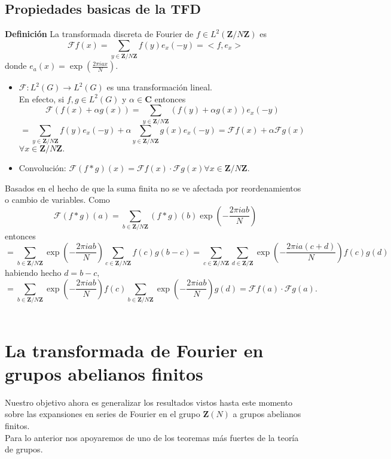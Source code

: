 \documentclass[a4paper,openright,10pt]{article}
\begin{document}

\subsection{Propiedades basicas de la TFD}
\textbf{Definici\'on} La transformada discreta de Fourier de $f\in L^{2}(\mathbf{Z}/N\mathbf{Z})$ es $$
\mathcal{F}f(x)=\sum\limits_{y\in \mathbf{Z}/N\mathbf{Z}}f(y)e_{x}(-y)=<f,e_{x}>$$ donde $e_{a}(x)=\exp(\frac{2\pi iax}{N}).$\\
\begin{itemize}
	\item $\mathcal{F}: L^{2} (G) \rightarrow L^{2} (G)$ es una transformaci\'on lineal.\\ 
    En efecto, si $f, g \in L^{2} (G)$ y $\alpha \in \mathbf{C}$ entonces $$
    \mathcal{F} (f(x)+\alpha g(x))= \sum \limits _{y \in \mathbf{Z}/N\mathbf{Z}} (f(y)+\alpha g(x))e_{x}(-y)$$ $$=
    \sum \limits _{y \in \mathbf{Z}/N\mathbf{Z}} f(y)e_{x}(-y)+\alpha\sum\limits _{y \in \mathbf{Z}/N\mathbf{Z}} g(x)e_{x}(-y) = \mathcal{F}f(x)+\alpha\mathcal{F}g(x)
    $$ $\forall x \in \mathbf{Z}/N\mathbf{Z}.$
    \item \textrm{Convoluci\'on:} $\mathcal{F} (f*g)(x)=\mathcal{F}f(x) \cdot \mathcal{F}g(x) \forall x \in \mathbf{Z}/N\mathbf{Z}.$
\end{itemize}

Basados en el hecho de que la suma finita no se ve afectada por reordenamientos o cambio de variables. 
Como $$
\mathcal{F}(f*g)(a)=\sum\limits_{b\in \mathbf{Z}/N\mathbf{Z}} (f*g)(b)\exp(-\frac{2\pi iab}{N})
$$ entonces
$$
=\sum\limits_{b\in \mathbf{Z}/N\mathbf{Z}} \exp(-\frac{2\pi iab}{N})\sum\limits_{c\in \mathbf{Z}/N\mathbf{Z}} f(c)g(b-c)=\sum\limits_{c\in \mathbf{Z}/N\mathbf{Z}}\sum\limits_{d\in \mathbf{Z}/\mathbf{Z}}\exp(-\frac{2\pi ia(c+d)}{N})f(c)g(d)
$$ habiendo hecho $d=b-c,$
$$
=\sum\limits_{b\in \mathbf{Z}/N\mathbf{Z}} \exp(-\frac{2\pi iab}{N})f(c) \sum\limits_{b\in \mathbf{Z}/N\mathbf{Z}}\exp(-\frac{2\pi iab}{N}) g(d)=\mathcal{F}f(a)\cdot \mathcal{F}g(a).
$$\\

\section{La transformada de Fourier en grupos abelianos finitos} 
Nuestro objetivo ahora es generalizar los resultados vistos hasta este momento sobre las expansiones en series de Fourier en el grupo $\mathbf{Z}(N)$ a grupos abelianos finitos.\\
Para lo anterior nos apoyaremos de uno de los teoremas m\'as fuertes de la teor\'ia de grupos.\\ 
\end{document}
